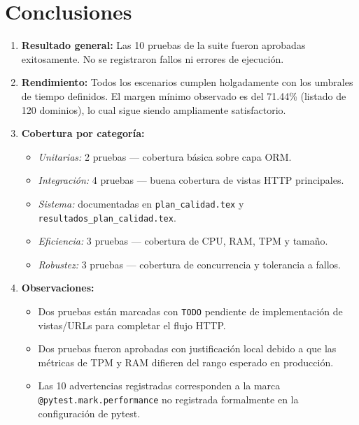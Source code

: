 \documentclass[12pt,a4paper]{article}
\begin{document}
\section{Conclusiones}

\begin{enumerate}
  \item \textbf{Resultado general:} Las 10 pruebas de la suite fueron aprobadas exitosamente.
        No se registraron fallos ni errores de ejecución.

  \item \textbf{Rendimiento:} Todos los escenarios cumplen holgadamente con los umbrales de
        tiempo definidos. El margen mínimo observado es del 71.44\% (listado de 120 dominios),
        lo cual sigue siendo ampliamente satisfactorio.

  \item \textbf{Cobertura por categoría:}
        \begin{itemize}
          \item \textit{Unitarias:} 2 pruebas — cobertura básica sobre capa ORM.
          \item \textit{Integración:} 4 pruebas — buena cobertura de vistas HTTP principales.
          \item \textit{Sistema:} documentadas en \texttt{plan\_calidad.tex} y \texttt{resultados\_plan\_calidad.tex}.
          \item \textit{Eficiencia:} 3 pruebas — cobertura de CPU, RAM, TPM y tamaño.
          \item \textit{Robustez:} 3 pruebas — cobertura de concurrencia y tolerancia a fallos.
        \end{itemize}

  \item \textbf{Observaciones:}
        \begin{itemize}
          \item Dos pruebas están marcadas con \texttt{TODO} pendiente de implementación de
                vistas/URLs para completar el flujo HTTP.
          \item Dos pruebas fueron aprobadas con justificación local debido a que las métricas
                de TPM y RAM difieren del rango esperado en producción.
          \item Las 10 advertencias registradas corresponden a la marca \texttt{@pytest.mark.performance}
                no registrada formalmente en la configuración de pytest.
        \end{itemize}


\end{enumerate}
\end{document}
